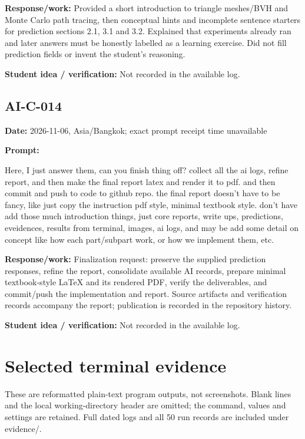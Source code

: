 \documentclass[11pt,a4paper]{article}
\begin{document}
\noindent\textbf{Response/work:} Provided a short introduction to triangle meshes/\allowbreak{}BVH and Monte Carlo path tracing, then conceptual hints and incomplete sentence starters for prediction sections 2.1, 3.1 and 3.2. Explained that experiments already ran and later answers must be honestly labelled as a learning exercise. Did not fill prediction fields or invent the student's reasoning.\par
\noindent\textbf{Student idea / verification:} Not recorded in the available log.\par\medskip
{}\subsection*{AI-C-014}
\noindent\textbf{Date:} 2026-11-06, Asia/\allowbreak{}Bangkok; exact prompt receipt time unavailable\par
\noindent\textbf{Prompt:}
\begin{prompt}
Here, I just answer them, can you finish thing off? collect all the ai logs, refine
report, and then make the final report latex and render it to pdf. and then commit and
push to code to github repo. the final report doesn't have to be fancy, like just copy
the instruction pdf style, minimal textbook style. don't have add those much introduction
 things, just core reports, write ups, predictions, eveidences, results from terminal,
images, ai logs, and may be add some detail on concept like how each part/subpart work,
or how we implement them, etc.
\end{prompt}
\noindent\textbf{Response/work:} Finalization request: preserve the supplied prediction responses, refine the report, consolidate available AI records, prepare minimal textbook-style LaTeX and its rendered PDF, verify the deliverables, and commit/\allowbreak{}push the implementation and report. Source artifacts and verification records accompany the report; publication is recorded in the repository history.\par
\noindent\textbf{Student idea / verification:} Not recorded in the available log.\par\medskip\clearpage\section{Selected terminal evidence}
These are reformatted plain-text program outputs, not screenshots. Blank lines and the local working-directory header are omitted; the command, values and settings are retained. Full dated logs and all 50 run records are included under evidence/.
\end{document}
